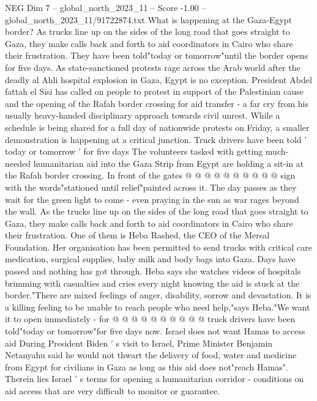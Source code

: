 \begin{textsample}{NEG Dim 7 – global\_north\_2023\_11 – Score -1.00 – global\_north\_2023\_11/91722874.txt}  \label{ex:f7_neg_321}
What is happening at the Gaza-Egypt border?
As trucks line up on the sides of the long road that goes straight to Gaza, they make calls back and forth to aid coordinators in Cairo who share their frustration.
They have been told"today or tomorrow"until the border opens for five days.
As state-sanctioned protests rage across the Arab world after the deadly al Ahli hospital explosion in Gaza, Egypt is no exception.
President Abdel fattah el Sisi has called on people to protest in support of the Palestinian cause and the opening of the Rafah border crossing for aid transfer - a far cry from his usually heavy-handed disciplinary approach towards civil unrest.
While a schedule is being shared for a full day of nationwide protests on Friday, a smaller demonstration is happening at a critical junction.
Truck drivers have been told ' today or tomorrow ' for five days The volunteers tasked with getting much-needed humanitarian aid into the Gaza Strip from Egypt are holding a sit-in at the Rafah border crossing.
In front of the gates @ @ @ @ @ @ @ @ @ @ sign with the words"stationed until relief"painted across it.
The day passes as they wait for the green light to come - even praying in the sun as war rages beyond the wall.
As the trucks line up on the sides of the long road that goes straight to Gaza, they make calls back and forth to aid coordinators in Cairo who share their frustration.
One of them is Heba Rashed, the CEO of the Mersal Foundation.
Her organisation has been permitted to send trucks with critical care medication, surgical supplies, baby milk and body bags into Gaza.
Days have passed and nothing has got through.
Heba says she watches videos of hospitals brimming with casualties and cries every night knowing the aid is stuck at the border."There are mixed feelings of anger, disability, sorrow and devastation.
It is a killing feeling to be unable to reach people who need help,"says Heba."We want it to open immediately - for @ @ @ @ @ @ @ @ @ @ truck drivers have been told"today or tomorrow"for five days now.
Israel does not want Hamas to access aid During President Biden ' s visit to Israel, Prime Minister Benjamin Netanyahu said he would not thwart the delivery of food, water and medicine from Egypt for civilians in Gaza as long as this aid does not"reach Hamas".
Therein lies Israel ' s terms for opening a humanitarian corridor - conditions on aid access that are very difficult to monitor or guarantee.

\end{textsample}
